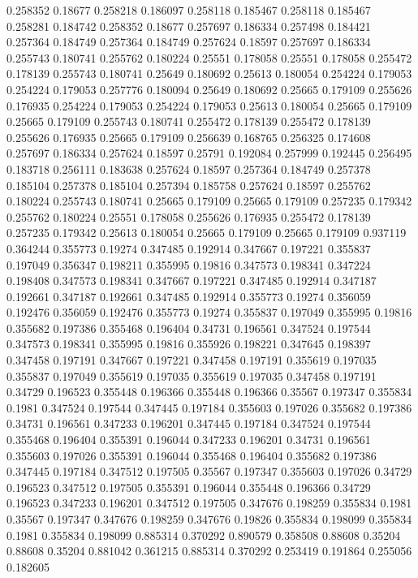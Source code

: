 0.258352 0.18677
0.258218 0.186097
0.258118 0.185467
0.258118 0.185467
0.258281 0.184742
0.258352 0.18677
0.257697 0.186334
0.257498 0.184421
0.257364 0.184749
0.257364 0.184749
0.257624 0.18597
0.257697 0.186334
0.255743 0.180741
0.255762 0.180224
0.25551 0.178058
0.25551 0.178058
0.255472 0.178139
0.255743 0.180741
0.25649 0.180692
0.25613 0.180054
0.254224 0.179053
0.254224 0.179053
0.257776 0.180094
0.25649 0.180692
0.25665 0.179109
0.255626 0.176935
0.254224 0.179053
0.254224 0.179053
0.25613 0.180054
0.25665 0.179109
0.25665 0.179109
0.255743 0.180741
0.255472 0.178139
0.255472 0.178139
0.255626 0.176935
0.25665 0.179109
0.256639 0.168765
0.256325 0.174608
0.257697 0.186334
0.257624 0.18597
0.25791 0.192084
0.257999 0.192445
0.256495 0.183718
0.256111 0.183638
0.257624 0.18597
0.257364 0.184749
0.257378 0.185104
0.257378 0.185104
0.257394 0.185758
0.257624 0.18597
0.255762 0.180224
0.255743 0.180741
0.25665 0.179109
0.25665 0.179109
0.257235 0.179342
0.255762 0.180224
0.25551 0.178058
0.255626 0.176935
0.255472 0.178139
0.257235 0.179342
0.25613 0.180054
0.25665 0.179109
0.25665 0.179109
0.937119 0.364244
0.355773 0.19274
0.347485 0.192914
0.347667 0.197221
0.355837 0.197049
0.356347 0.198211
0.355995 0.19816
0.347573 0.198341
0.347224 0.198408
0.347573 0.198341
0.347667 0.197221
0.347485 0.192914
0.347187 0.192661
0.347187 0.192661
0.347485 0.192914
0.355773 0.19274
0.356059 0.192476
0.356059 0.192476
0.355773 0.19274
0.355837 0.197049
0.355995 0.19816
0.355682 0.197386
0.355468 0.196404
0.34731 0.196561
0.347524 0.197544
0.347573 0.198341
0.355995 0.19816
0.355926 0.198221
0.347645 0.198397
0.347458 0.197191
0.347667 0.197221
0.347458 0.197191
0.355619 0.197035
0.355837 0.197049
0.355619 0.197035
0.355619 0.197035
0.347458 0.197191
0.34729 0.196523
0.355448 0.196366
0.355448 0.196366
0.35567 0.197347
0.355834 0.1981
0.347524 0.197544
0.347445 0.197184
0.355603 0.197026
0.355682 0.197386
0.34731 0.196561
0.347233 0.196201
0.347445 0.197184
0.347524 0.197544
0.355468 0.196404
0.355391 0.196044
0.347233 0.196201
0.34731 0.196561
0.355603 0.197026
0.355391 0.196044
0.355468 0.196404
0.355682 0.197386
0.347445 0.197184
0.347512 0.197505
0.35567 0.197347
0.355603 0.197026
0.34729 0.196523
0.347512 0.197505
0.355391 0.196044
0.355448 0.196366
0.34729 0.196523
0.347233 0.196201
0.347512 0.197505
0.347676 0.198259
0.355834 0.1981
0.35567 0.197347
0.347676 0.198259
0.347676 0.19826
0.355834 0.198099
0.355834 0.1981
0.355834 0.198099
0.885314 0.370292
0.890579 0.358508
0.88608 0.35204
0.88608 0.35204
0.881042 0.361215
0.885314 0.370292
0.253419 0.191864
0.255056 0.182605
